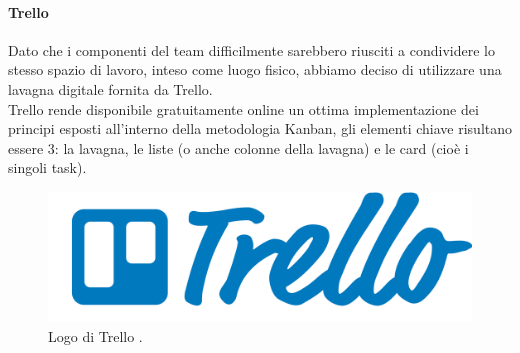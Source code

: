 \paragraph{Trello}
Dato che i componenti del team difficilmente sarebbero riusciti a condividere lo stesso spazio di lavoro, inteso come luogo fisico, abbiamo deciso di utilizzare una lavagna digitale fornita da Trello.
\\ Trello rende disponibile gratuitamente online un ottima implementazione dei principi esposti all'interno della metodologia Kanban, gli elementi chiave risultano essere 3: la lavagna, le liste (o anche colonne della lavagna) e le card (cioè i singoli task).
\begin{figure}[h!]
	\centering
	\includegraphics[scale=0.08]{figures/trello-logo}
	\caption[Logo Trello]{Logo di Trello \cite{trello}.
		\label{fig:trello}}
\end{figure}
